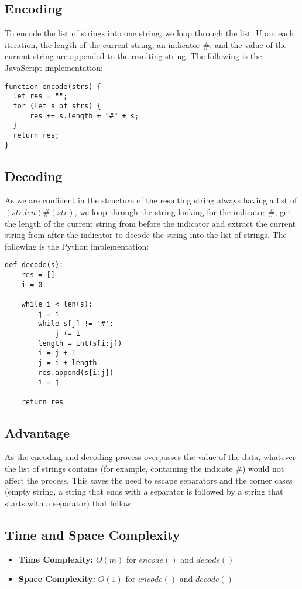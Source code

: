 \documentclass[12pt,a4paper]{article}
\begin{document}
\subsection{Encoding}
To encode the list of strings into one string, we loop through the list. Upon each iteration, the length of the current string, an indicator $\#$, and the value of the current string are appended to the resulting string. The following is the JavaScript implementation:

\begin{verbatim}
function encode(strs) {
  let res = "";
  for (let s of strs) {
      res += s.length + "#" + s;
  }
  return res;
}
\end{verbatim}

\subsection{Decoding}
As we are confident in the structure of the resulting string always having a list of $(str.len)\#(str)$, we loop through the string looking for the indicator $\#$, get the length of the current string from before the indicator and extract the current string from after the indicator to decode the string into the list of strings. 
The following is the Python implementation:

\begin{verbatim}
def decode(s):
    res = []
    i = 0
    
    while i < len(s):
        j = i
        while s[j] != '#':
            j += 1
        length = int(s[i:j])
        i = j + 1
        j = i + length
        res.append(s[i:j])
        i = j
        
    return res
\end{verbatim}

\subsection{Advantage}
As the encoding and decoding process overpasses the value of the data, whatever the list of strings contains (for example, containing the indicate $\#$) would not affect the process. This saves the need to escape separators and the corner cases (empty string, a string that ends with a separator is followed by a string that starts with a separator) that follow.

\subsection{Time and Space Complexity}
\begin{itemize}
    \item \textbf{Time Complexity:} $O(m)$ for $encode()$ and $decode()$
    \item \textbf{Space Complexity:} $O(1)$ for $encode()$ and $decode()$
\end{itemize}
\end{document}
